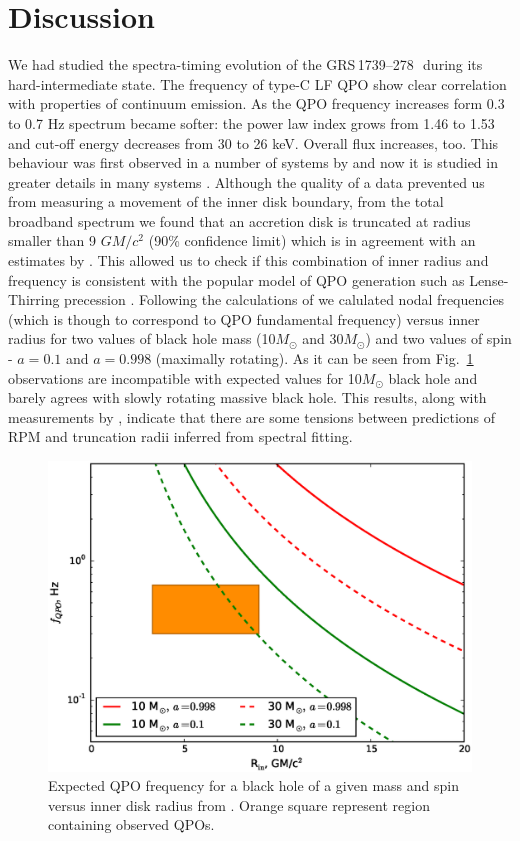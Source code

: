 \documentclass[a4paper,fleqn,usenatbib]{mnras}
\def\grs{{GRS\,1739--278\,}}
\begin{document}
\section{Discussion}
We had studied the spectra-timing evolution of the \grs\, during its hard-intermediate state.  The frequency of type-C LF QPO show clear correlation with properties of continuum emission. 
As the QPO frequency increases form 0.3 to 0.7 Hz spectrum became softer: the power law index grows from 1.46 to 1.53 and cut-off energy decreases from 30 to 26 keV. Overall flux increases, too. 
This behaviour was first observed in a number of systems by \citet{dimatteo99} and now it is studied in greater details in many systems \citep[see e.g.][ and many more]{vignarca03,stiele13,seifina14,fuerst16_gx339}. Although the quality of a data prevented us from measuring a movement of the inner disk boundary, from the total broadband spectrum we found that an accretion disk is truncated at radius smaller than 9 $GM/c^{2}$ (90\% confidence limit) which is in agreement with an estimates by \citet{miller15_nust}. This allowed us to check if this combination of inner radius and frequency is consistent with the popular model of QPO generation such as Lense-Thirring precession \citep{ingram09}. Following the calculations of \citet{ingram14} we calulated nodal frequencies (which is though to correspond to QPO fundamental frequency) versus inner radius for two values of black hole mass (10$M_{\odot}$ and 30$M_{\odot}$) and two values of spin - $a=0.1$ and $a=0.998$ (maximally rotating). As it can be seen from Fig.~\ref{fig:qpoconstr} observations are incompatible with expected values for 10$M_{\odot}$ black hole and barely agrees with slowly rotating massive black hole. This results, along with measurements by \cite{fuerst16_gx339}, indicate that there are some tensions between predictions of RPM and truncation radii inferred from spectral fitting.

\begin{figure}
        \includegraphics[width=\columnwidth]{qpoconstr_v03.eps}
        \caption{Expected QPO frequency for a black hole of a given mass and spin versus inner disk radius from \protect\cite{ingram14}. Orange square represent region containing observed QPOs.}
        \label{fig:qpoconstr}
\end{figure}
\end{document}
